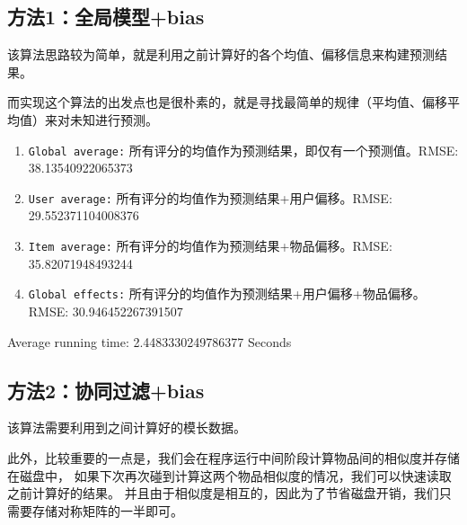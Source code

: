 \subsection{方法1：全局模型+bias}

该算法思路较为简单，就是利用之前计算好的各个均值、偏移信息来构建预测结果。

而实现这个算法的出发点也是很朴素的，就是寻找最简单的规律（平均值、偏移平均值）来对未知进行预测。
\begin{enumerate}
	\item \texttt{Global average:} 所有评分的均值作为预测结果，即仅有一个预测值。RMSE:  38.13540922065373
	\item \texttt{User average:} 所有评分的均值作为预测结果+用户偏移。RMSE:  29.552371104008376
	\item \texttt{Item average:} 所有评分的均值作为预测结果+物品偏移。RMSE:  35.82071948493244
	\item \texttt{Global effects:} 所有评分的均值作为预测结果+用户偏移+物品偏移。RMSE:  30.946452267391507
\end{enumerate}

Average running time: 2.4483330249786377 Seconds

\subsection{方法2：协同过滤+bias}
该算法需要利用到之间计算好的模长数据。

此外，比较重要的一点是，我们会在程序运行中间阶段计算物品间的相似度并存储在磁盘中，
如果下次再次碰到计算这两个物品相似度的情况，我们可以快速读取之前计算好的结果。
并且由于相似度是相互的，因此为了节省磁盘开销，我们只需要存储对称矩阵的一半即可。

